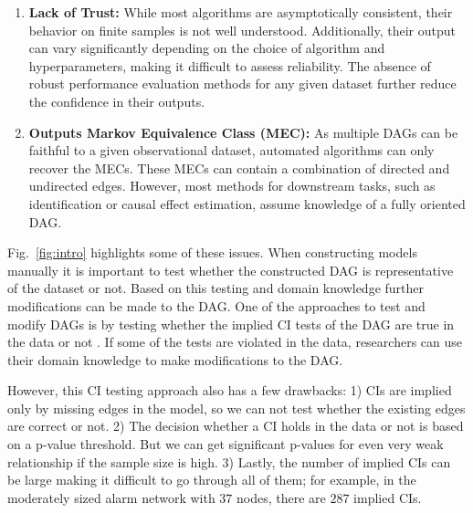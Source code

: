 \documentclass{uai2025} %
\begin{document}
\begin{enumerate}
	\item \textbf{Lack of Trust:} While most algorithms are asymptotically
		consistent, their behavior on finite samples is not well
		understood. Additionally, their output can vary significantly
		depending on the choice of algorithm and hyperparameters,
		making it difficult to assess reliability. The absence of
		robust performance evaluation methods for any given dataset
		further reduce the confidence in their outputs. 
	\item \textbf{Outputs Markov Equivalence Class (MEC):} As multiple
		DAGs can be faithful to a given observational dataset, automated 
		algorithms can only recover the MECs. These MECs can contain a
		combination of directed and undirected edges. However, most
		methods for downstream tasks, such as identification or causal
		effect estimation, assume knowledge of a fully oriented DAG. 
\end{enumerate}

Fig.~\ref{fig:intro} highlights some of these issues. When constructing models
manually it is important to test whether the constructed DAG is representative
of the dataset or not. Based on this testing and domain knowledge further
modifications can be made to the DAG. One of the approaches to test and modify
DAGs is by testing whether the implied CI tests of the DAG are true in the data
or not \citep{Ankan2021}. If some of the tests are violated in the data,
researchers can use their domain knowledge to make modifications to the DAG.

However, this CI testing approach also has a few drawbacks: 1) CIs are implied
only by missing edges in the model, so we can not test whether the existing
edges are correct or not. 2) The decision whether a CI holds in the data or not
is based on a p-value threshold. But we can get significant p-values for even
very weak relationship if the sample size is high. 3) Lastly, the number of
implied CIs can be large making it difficult to go through all of them; for 
example, in the moderately sized alarm network \citep{Beinlich1989} with $ 37 $
nodes, there are $ 287 $ implied CIs.


\end{document}
